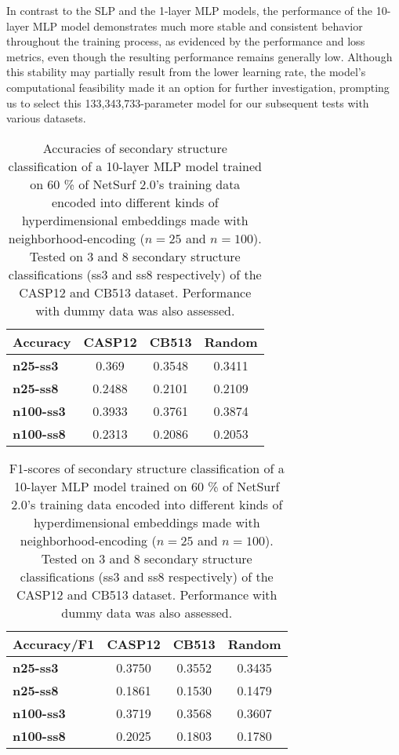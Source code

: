 In contrast to the SLP and the 1-layer MLP models, the performance of the 10-layer MLP model demonstrates much more stable and consistent behavior throughout the training process, as evidenced by the performance and loss metrics, even though the resulting performance remains generally low. Although this stability may partially result from the lower learning rate, the model's computational feasibility made it an option for further investigation, prompting us to select this 133,343,733-parameter model for our subsequent tests with various datasets.

\begin{table}[h]
    \caption{Accuracies of secondary structure classification of a 10-layer MLP model trained on 60 \% of NetSurf 2.0's training data encoded into different kinds of hyperdimensional embeddings made with neighborhood-encoding ($n = 25$ and $n=100$). Tested on 3 and 8 secondary structure classifications (ss3 and ss8 respectively) of the CASP12 and CB513 dataset. Performance with dummy data was also assessed.}
    \label{tab:casp}
    \centering
    \begin{tabular}{lccc}
        \toprule
        \textbf{Accuracy} & CASP12 & CB513 & Random\\
        \midrule
        \textbf{n25-ss3} & 0.369 & 0.3548 & 0.3411\\
        \textbf{n25-ss8} & 0.2488 & 0.2101& 0.2109\\
        \textbf{n100-ss3} & 0.3933 & 0.3761 & 0.3874\\
        \textbf{n100-ss8} & 0.2313 & 0.2086 & 0.2053\\
        \bottomrule
    \end{tabular}
  \end{table}

  \begin{table}[h]
    \caption{F1-scores of secondary structure classification of a 10-layer MLP model trained on 60 \% of NetSurf 2.0's training data encoded into different kinds of hyperdimensional embeddings made with neighborhood-encoding ($n = 25$ and $n=100$). Tested on 3 and 8 secondary structure classifications (ss3 and ss8 respectively) of the CASP12 and CB513 dataset. Performance with dummy data was also assessed.}
    \label{tab:casp}
    \centering
    \begin{tabular}{lccc}
        \toprule
        \textbf{Accuracy/F1} & CASP12 & CB513 & Random\\
        \midrule
        \textbf{n25-ss3} & 0.3750 & 0.3552 & 0.3435\\
        \textbf{n25-ss8} & 0.1861 & 0.1530 & 0.1479\\
        \textbf{n100-ss3} & 0.3719 & 0.3568 & 0.3607\\
        \textbf{n100-ss8} & 0.2025 & 0.1803 & 0.1780\\
        \bottomrule
    \end{tabular}
  \end{table}

